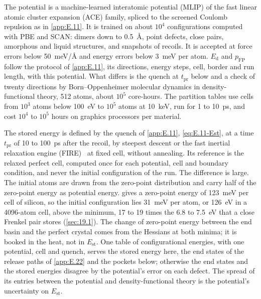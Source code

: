 The potential is a machine-learned interatomic potential (MLIP) of the fast linear atomic cluster expansion (ACE) family, spliced to the screened Coulomb repulsion as in \cref{app:E.11}. It is trained on about $10^4$ configurations computed with PBE and SCAN: dimers down to \SI{0.5}{\angstrom}, point defects, close pairs, amorphous and liquid structures, and snapshots of recoils. It is accepted at force errors below \SI{50}{meV/\angstrom} and energy errors below \SI{3}{meV} per atom. $E_{\mathrm{d}}$ and $p_{\mathrm{FP}}$ follow the protocol of \cref{app:E.11}, its directions, energy steps, cell, border and run length, with this potential. What differs is the quench at $t_{\mathrm{pr}}$ below and a check of twenty directions by Born--Oppenheimer molecular dynamics in density-functional theory, 512 atoms, about $10^5$ core-hours. The partition tables use cells from $10^3$ atoms below \SI{100}{eV} to $10^5$ atoms at \SI{10}{keV}, run for 1 to \SI{10}{ps}, and cost $10^4$ to $10^5$ hours on graphics processors per material.

The stored energy is defined by the quench of \cref{app:E.11}, \cref{eq:E.11-Est}, at a time $t_{\mathrm{pr}}$ of 10 to \SI{100}{ps} after the recoil, by steepest descent or the fast inertial relaxation engine (FIRE)~\cite{bitzek2006structural} at fixed cell, without annealing. Its reference is the relaxed perfect cell, computed once for each potential, cell and boundary condition, and never the initial configuration of the run. The difference is large. The initial atoms are drawn from the zero-point distribution and carry half of the zero-point energy as potential energy.  gives a zero-point energy of \SI{123}{meV} per cell of silicon, so the initial configuration lies \SI{31}{meV} per atom, or \SI{126}{eV} in a 4096-atom cell, above the minimum, 17 to 19 times the 6.8 to \SI{7.5}{eV} that a close Frenkel pair stores (\cref{sec:19.1}). The change of zero-point energy between the end basin and the perfect crystal comes from the Hessians at both minima; it is booked in the heat, not in $E_{\mathrm{st}}$. One table of configurational energies, with one potential, cell and quench, serves the stored energy here, the end states of the release paths of \cref{app:E.22} and the pockets below; otherwise the end states and the stored energies disagree by the potential's error on each defect. The spread of its entries between the potential and density-functional theory is the potential's uncertainty on $E_{\mathrm{st}}$.

